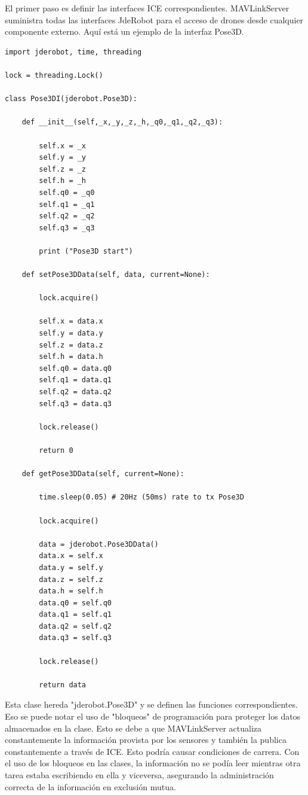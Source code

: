 El primer paso es definir las interfaces ICE correspondientes. MAVLinkServer suministra todas las interfaces JdeRobot para el acceso de drones desde cualquier componente externo. Aquí está un ejemplo de la interfaz Pose3D.

\bigskip
\bigskip

\begin{lstlisting}[frame=single]
import jderobot, time, threading

lock = threading.Lock()

class Pose3DI(jderobot.Pose3D):

    def __init__(self,_x,_y,_z,_h,_q0,_q1,_q2,_q3):

        self.x = _x
        self.y = _y
        self.z = _z
        self.h = _h
        self.q0 = _q0
        self.q1 = _q1
        self.q2 = _q2
        self.q3 = _q3

        print ("Pose3D start")

    def setPose3DData(self, data, current=None):

        lock.acquire()

        self.x = data.x
        self.y = data.y
        self.z = data.z
        self.h = data.h
        self.q0 = data.q0
        self.q1 = data.q1
        self.q2 = data.q2
        self.q3 = data.q3

        lock.release()

        return 0

    def getPose3DData(self, current=None):

        time.sleep(0.05) # 20Hz (50ms) rate to tx Pose3D

        lock.acquire()

        data = jderobot.Pose3DData()
        data.x = self.x
        data.y = self.y
        data.z = self.z
        data.h = self.h
        data.q0 = self.q0
        data.q1 = self.q1
        data.q2 = self.q2
        data.q3 = self.q3

        lock.release()

        return data
\end{lstlisting}  

Esta clase hereda "jderobot.Pose3D" y se definen las funciones correspondientes. Eso
se puede notar el uso de "bloqueos" de programación para proteger los datos almacenados en la clase. Esto se debe a que MAVLinkServer actualiza constantemente la información provista por los sensores y también la publica constantemente a través de ICE. Esto podría causar condiciones de carrera. Con el uso de los bloqueos en las clases, la información no se podía leer mientras otra tarea estaba escribiendo en ella y viceversa, asegurando la administración correcta de la información en exclusión mutua.

